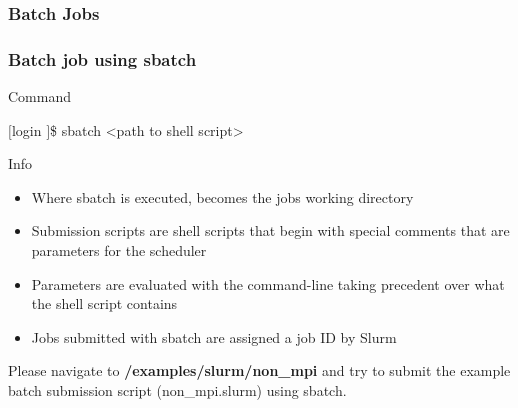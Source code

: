 \subsubsection{Batch Jobs}
\begin{frame}
  \frametitle{Batch job using sbatch}
  \begin{block}{Command}
		\begin{semiverbatim}$[$login \ctilde$]$\$ sbatch <path to shell script>\end{semiverbatim}	
  \end{block}
  \begin{block}{Info}
		\begin{itemize}
		\item Where sbatch is executed, becomes the jobs working directory
		\item Submission scripts are shell scripts that begin with special comments that are parameters for the scheduler
		\item Parameters are evaluated with the command-line taking precedent over what the shell script contains
                \item Jobs submitted with sbatch are assigned a job ID by Slurm
		\end{itemize}
	\end{block}
	  \btVFill
  \begin{center}Please navigate to \textbf{\ctilde/examples/slurm/non\_mpi} and try to submit the example batch submission script (non\_mpi.slurm)  using sbatch.\end{center}
\end{frame}


